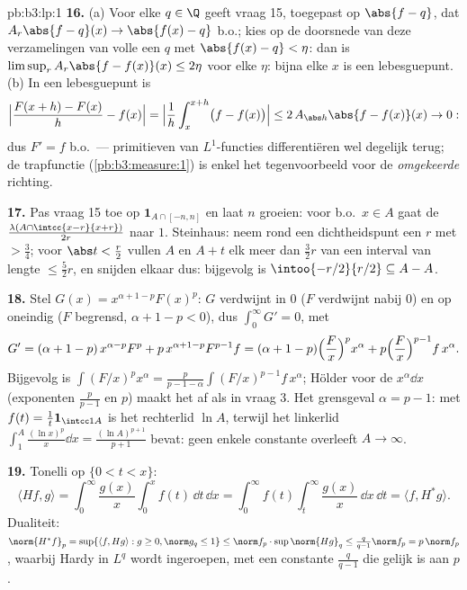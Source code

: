 \begin{solution}{pb:b3:lp:1}
\textbf{16.} (a) Voor elke $q \in \Q$ geeft vraag 15, toegepast
op $\abs{f - q}$, dat $A_r\abs{f - q}(x) \to \abs{f(x) - q}$
b.o.; kies op de doorsnede van deze verzamelingen van volle 
een $q$ met $\abs{f(x) - q} < \eta$: dan is $\limsup_rA_r\abs{f -
f(x)}(x) \leq 2\eta$ voor elke $\eta$: bijna elke $x$ is een
lebesguepunt. (b) In een lebesguepunt is
\[
\Bigl|\frac{F(x + h) - F(x)}h - f(x)\Bigr|
= \Bigl|\frac1h\int_x^{x+h}\bigl(f - f(x)\bigr)\Bigr|
\leq 2\,A_{\abs h}\abs{f - f(x)}(x) \to 0 :
\]
dus $F' = f$ b.o.\ --- primitieven van $L^1$-functies
differentiëren wel degelijk terug; de trapfunctie
(\cref{pb:b3:measure:1}) is enkel het tegenvoorbeeld voor de
\emph{omgekeerde} richting.

\textbf{17.} Pas vraag 15 toe op $\mathbf 1_{A\cap[-n,n]}$ en
laat $n$ groeien: voor b.o.\ $x \in A$ gaat de 
$\frac{\lambda(A\cap\intcc{x-r}{x+r})}{2r}$ naar $1$. Steinhaus:
neem rond een dichtheidspunt een $r$ met  $> \frac34$;
voor $\abs t < \frac r2$ vullen $A$ en $A + t$ elk meer dan
$\frac32r$ van een interval van lengte $\leq \frac52r$, en snijden
elkaar dus: bijgevolg is $\intoo{-r/2}{r/2} \subseteq A - A$.

\textbf{18.} Stel $G(x) = x^{\alpha+1-p}F(x)^p$: $G$ verdwijnt in
$0$ ($F$ verdwijnt nabij $0$) en op oneindig ($F$ begrensd,
$\alpha + 1 - p < 0$), dus $\int_0^\infty G' = 0$, met
\[
G' = (\alpha + 1 - p)\,x^{\alpha-p}F^p +
p\,x^{\alpha+1-p}F^{p-1}f
= (\alpha + 1 - p)\Bigl(\frac Fx\Bigr)^px^\alpha +
p\Bigl(\frac Fx\Bigr)^{p-1}f\,x^\alpha .
\]
Bijgevolg is $\int(F/x)^px^\alpha = \frac{p}{p-1-\alpha}
\int(F/x)^{p-1}f\,x^\alpha$; Hölder voor de  $x^\alpha\dd x$
(exponenten $\frac p{p-1}$ en $p$) maakt het af als in vraag 3.
Het grensgeval $\alpha = p - 1$: met $f(t) = \frac1t\mathbf
1_{\intcc1A}$ is het rechterlid $\ln A$, terwijl het linkerlid
$\int_1^A\frac{(\ln x)^p}x\dd x = \frac{(\ln A)^{p+1}}{p+1}$
bevat: geen enkele constante overleeft $A \to \infty$.

\textbf{19.} Tonelli op $\{0 < t < x\}$:
\[
\langle Hf, g\rangle =
\int_0^\infty\frac{g(x)}x\int_0^xf(t)\,\dd t\,\dd x
= \int_0^\infty f(t)\int_t^\infty\frac{g(x)}x\,\dd x\,\dd t
= \langle f, H^*g\rangle .
\]
Dualiteit: $\norm{H^*f}_p = \sup\{\langle f, Hg\rangle : g \geq
0, \norm g_q \leq 1\} \leq \norm f_p\cdot \sup\norm{Hg}_q \leq
\frac q{q-1}\norm f_p = p\,\norm f_p$, waarbij Hardy in $L^q$
wordt ingeroepen, met een constante $\frac q{q-1}$ die gelijk is
aan $p$.


\end{solution}
